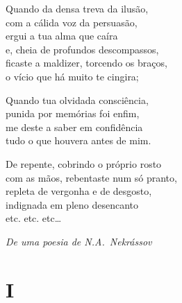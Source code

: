 \epigraph{%
Quando da densa treva da ilusão,\\
com a cálida voz da persuasão,\\
ergui a tua alma que caíra\\
e, cheia de profundos descompassos,\\
ficaste a maldizer, torcendo os braços,\\
o vício que há muito te cingira;

Quando tua olvidada consciência,\\
punida por memórias foi enfim,\\
me deste a saber em confidência\\
tudo o que houvera antes de mim.

De repente, cobrindo o próprio rosto\\
com as mãos, rebentaste num só pranto,\\
repleta de vergonha e de desgosto,\\
indignada em pleno desencanto\\
etc. etc. etc\ldots{}}{\textit{De uma poesia de N.A.~Nekrássov}\footnotemark}

\medskip

\section{I}

